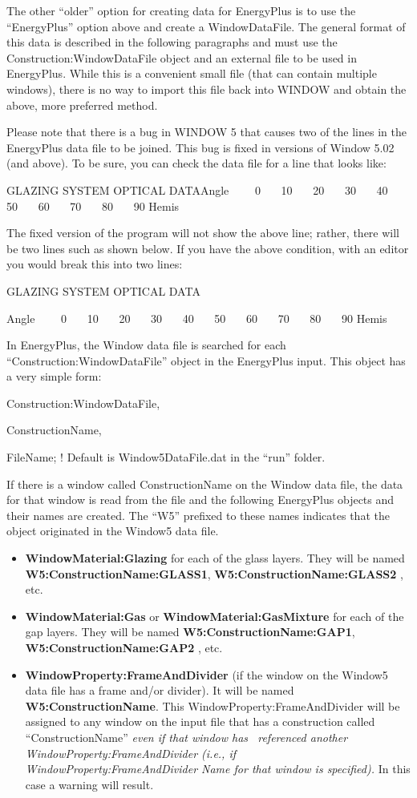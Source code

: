 The other ``older'' option for creating data for EnergyPlus is to use the ``EnergyPlus'' option above and create a WindowDataFile. The general format of this data is described in the following paragraphs and must use the Construction:WindowDataFile object and an external file to be used in EnergyPlus. While this is a convenient small file (that can contain multiple windows), there is no way to import this file back into WINDOW and obtain the above, more preferred method.

Please note that there is a bug in WINDOW 5 that causes two of the lines in the EnergyPlus data file to be joined. This bug is fixed in versions of Window 5.02 (and above). To be sure, you can check the data file for a line that looks like:

GLAZING SYSTEM OPTICAL DATAAngle~~~~ 0~~~ 10~~~ 20~~~ 30~~~ 40~~~ 50~~~ 60~~~ 70~~~ 80~~~ 90 Hemis

The fixed version of the program will not show the above line; rather, there will be two lines such as shown below. If you have the above condition, with an editor you would break this into two lines:

GLAZING SYSTEM OPTICAL DATA

Angle~~~~ 0~~~ 10~~~ 20~~~ 30~~~ 40~~~ 50~~~ 60~~~ 70~~~ 80~~~ 90 Hemis

In EnergyPlus, the Window data file is searched for each ``Construction:WindowDataFile'' object in the EnergyPlus input. This object has a very simple form:

Construction:WindowDataFile,

ConstructionName,

FileName; ! Default is Window5DataFile.dat in the ``run'' folder.

If there is a window called ConstructionName on the Window data file, the data for that window is read from the file and the following EnergyPlus objects and their names are created. The ``W5'' prefixed to these names indicates that the object originated in the Window5 data file.

\begin{itemize}
\item
  \textbf{WindowMaterial:Glazing} for each of the glass layers. They will be named \textbf{W5:ConstructionName:GLASS1}, \textbf{W5:ConstructionName:GLASS2} , etc.
\item
  \textbf{WindowMaterial:Gas} or \textbf{WindowMaterial:GasMixture} for each of the gap layers. They will be named \textbf{W5:ConstructionName:GAP1}, \textbf{W5:ConstructionName:GAP2} , etc.
\item
  \textbf{WindowProperty:FrameAndDivider} (if the window on the Window5 data file has a frame and/or divider). It will be named \textbf{W5:ConstructionName}. This WindowProperty:FrameAndDivider will be assigned to any window on the input file that has a construction called ``ConstructionName'' \emph{even if that window has~ referenced another WindowProperty:FrameAndDivider (i.e., if WindowProperty:FrameAndDivider Name for that window is specified).} In this case a warning will result.
\end{itemize}

